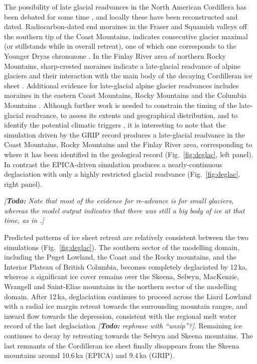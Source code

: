 \documentclass[tc, manuscript]{copernicus}
\newcommand{\todo}[1]{\emph{[\textbf{Todo:} #1]}}
\begin{document}
The possibility of late glacial readvances in the North American Cordillera has
been debated for some time \citep{Osborn.Gerloff.1997}, and locally these have
been reconstructed and dated. Radiocarbon-dated end moraines in the Fraser and
Squamish valleys off the southern tip of the Coast Mountains, indicates
consecutive glacier maximal (or stillstands while in overall retreat), one of
which one corresponds to the Younger Dryas chronozone \citep{Clague.etal.1997,
Friele.Clague.2002, Friele.Clague.2002a, Kovanen.2002,
Kovanen.Easterbrook.2002}. In the Finlay River area of northern Rocky
Mountains, sharp-crested moraines indicate a late-glacial readvance of alpine
glaciers and their interaction with the main body of the decaying Cordilleran
ice sheet \citep{Lakeman.etal.2008}. Additional evidence for late-glacial
alpine glacier readvances includes moraines in the eastern Coast Mountains,
Rocky Mountains and the Columbia Mountains \citep{Osborn.Gerloff.1997,
Menounos.etal.2008}. Although further work is needed to constrain the timing of
the late-glacial readvance, to assess its extents and geographical
distribution, and to identify the potential climatic triggers
\citep{Menounos.etal.2008}, it is interesting to note that the simulation
driven by the GRIP record produces a late-glacial readvance in the Coast
Mountains, Rocky Mountains and the Finlay River area, corresponding to where it
has been identified in the geological record (Fig.~\ref{fig:deglac}, left
panel). In contrast the EPICA-driven simulation produces a nearly-continuous
deglaciation with only a highly restricted glacial readvance
(Fig.~\ref{fig:deglac}, right panel).

\todo{Note that most of the evidence for re-advance is for small glaciers,
      whereas the model output indicates that there was still a big body of ice
      at that time, as in \citet{Lakeman.etal.2008}.}

Predicted patterns of ice sheet retreat are relatively consistent between the
two simulations (Fig.~\ref{fig:deglac}). The southern sector of the modelling
domain, including the Puget Lowland, the Coast and the Rocky mountains, and the
Interior Plateau of British Columbia, becomes completely deglaciated by 12\,ka,
whereas a significant ice cover remains over the Skeena, Selwyn, MacKenzie,
Wrangell and Saint-Elias mountains in the northern sector of the modelling
domain. After 12\,ka, deglaciation continues to proceed across the Liard
Lowland with a radial ice margin retreat towards the surrounding mountain
ranges, and inward flow towards the depression, consistent with the regional
melt water record of the last deglaciation \citep{Margold.etal.2013}
\todo{rephrase with ``unzip''?}. Remaining ice continues to decay by retreating
towards the Selwyn and Skeena mountains. The last remnants of the Cordilleran
ice sheet finally disappears from the Skeena mountains around 10.6\,ka (EPICA)
and 9.4\,ka (GRIP).
\end{document}
